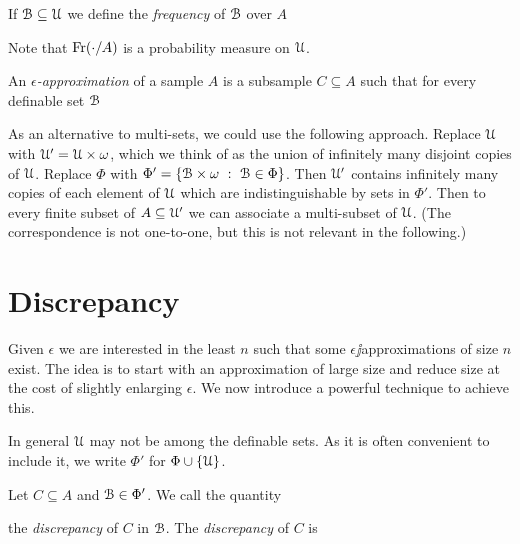 \documentclass[sputnik.tex]{subfiles}
\begin{document}
If $\EuScript B\subseteq\EuScript U$ we define the \emph{frequency\/} of $\EuScript B$ over $A$


Note that $\mathop{\rm Fr}(\cdot/A)$ is a probability measure on $\EuScript U$.

An \emph{$\epsilon$-approximation\/} of a sample $A$ is a subsample $C\subseteq A$ such that for every definable set $\EuScript B$


As an alternative to multi-sets, we could use the following approach. Replace $\EuScript U$ with $\EuScript U'=\EuScript U\times\omega$, which we think of as the union of infinitely many disjoint copies of $\EuScript U$. Replace $\Phi$ with $\Phi'=\{\B\times\omega\ :\ \B\in\Phi\}$. Then $\EuScript U'$ contains infinitely many copies of each element of $\EuScript U$ which are indistinguishable by sets in $\Phi'$. Then to every finite subset of $A\subseteq\EuScript U'$ we can associate a multi-subset of $\EuScript U$. (The correspondence is not one-to-one, but this is not relevant in the following.)

\section{Discrepancy}\label{epsilon_approximations}

Given $\epsilon$ we are interested in the least $n$ such that some $\epsilon\jj$approximations of size $n$ exist.
The idea is to start with an approximation of large size and reduce size at the cost of slightly enlarging $\epsilon$.
We now introduce a powerful technique to achieve this.

In general $\EuScript U$ may not be among the definable sets. As it is often convenient to include it, we write \emph{$\Phi'$\/} for $\Phi\cup\{\EuScript U\}$.

Let $C\subseteq A$ and $\EuScript B\in\Phi'$. We call the quantity 


the \emph{discrepancy\/} of $C$ in $\EuScript B$. 
The \emph{discrepancy\/} of $C$ is

\end{document}
